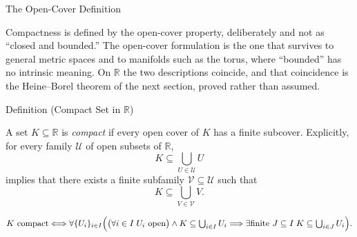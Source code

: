 \label{sec:compactness-on-r}

\begin{topicbox}{The Open-Cover Definition}
\begin{exposition}
Compactness is defined by the open-cover property, deliberately and not as ``closed and bounded.'' The open-cover formulation is the one that survives to general metric spaces and to manifolds such as the torus, where ``bounded'' has no intrinsic meaning. On $\mathbb{R}$ the two descriptions coincide, and that coincidence is the Heine--Borel theorem of the next section, proved rather than assumed.
\end{exposition}
\end{topicbox}
\begin{definitionbox}{Definition (Compact Set in $\mathbb{R}$)}
\begin{definition}
\label{def:compact-set}
A set $K\subseteq\mathbb{R}$ is \emph{compact} if every open cover of $K$ has
a finite subcover.  Explicitly, for every family $\mathcal{U}$ of open
subsets of $\mathbb{R}$,
\[
  K\subseteq\bigcup_{U\in\mathcal{U}}U
\]
implies that there exists a finite subfamily $\mathcal{V}\subseteq\mathcal{U}$
such that
\[
  K\subseteq\bigcup_{V\in\mathcal{V}}V.
\]
\end{definition}
\end{definitionbox}
\begin{remark*}
\[
K \text{ compact} \Longleftrightarrow \forall \{U_i\}_{i\in I}\Bigl(\bigl(\forall i\in I\;U_i \text{ open}\bigr)\land K\subseteq\textstyle\bigcup_{i\in I}U_i \Longrightarrow \exists \text{finite } J\subseteq I\;K\subseteq\textstyle\bigcup_{i\in J}U_i\Bigr).
\]
\end{remark*}

